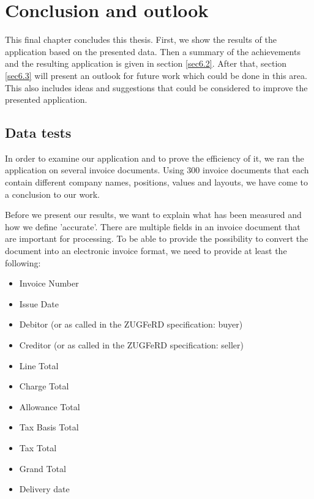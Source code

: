 %
% 
\chapter{Conclusion and outlook}
\label{cha6}

This final chapter concludes this thesis. First, we show the results of the application based on the presented data. Then a summary of the achievements and the resulting application is given in section \ref{sec6.2}. After that, section \ref{sec6.3} will present an outlook for future work which could be done in this area. This also includes ideas and suggestions that could be considered to improve the presented application.

\section{Data tests}
In order to examine our application and to prove the efficiency of it, we ran the application on several invoice documents. Using 300 invoice documents that each contain different company names, positions, values and layouts, we have come to a conclusion to our work.

Before we present our results, we want to explain what has been measured and how we define 'accurate'.
There are multiple fields in an invoice document that are important for processing. To be able to provide the possibility to convert the document into an electronic invoice format, we need to provide at least the following:
\begin{itemize}
\itemsep -1em 
	\item Invoice Number
	\item Issue Date
	\item Debitor (or as called in the ZUGFeRD specification: buyer)
	\item Creditor (or as called in the ZUGFeRD specification: seller)
	\item Line Total
	\item Charge Total
	\item Allowance Total
	\item Tax Basis Total
	\item Tax Total
	\item Grand Total
	\item Delivery date
\end{itemize}

